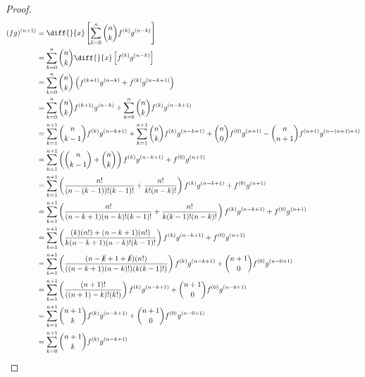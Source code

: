 \documentclass{article}
\begin{document}
\begin{itemize}
\begin{proof}
\begin{align*}
	(fg)^{(n+1)}&=\diff{}{x}\left[\sum_{k=0}^{n}\binom{n}{k}f^{(k)}g^{(n-k)}\right] \\
	&=\sum_{k=0}^{n}\binom{n}{k}\diff{}{x}\left[f^{(k)}g^{(n-k)}\right] \\
	&=\sum_{k=0}^{n}\binom{n}{k}\left(f^{(k+1)}g^{(n-k)}+f^{(k)}g^{(n-k+1)}\right) \\
	&=\sum_{k=0}^{n}\binom{n}{k}f^{(k+1)}g^{(n-k)}+\sum_{k=0}^{n}\binom{n}{k}f^{(k)}g^{(n-k+1)} \\
	&=\sum_{k=1}^{n+1}\binom{n}{k-1}f^{(k)}g^{(n-k+1)}+\sum_{k=1}^{n+1}\binom{n}{k}f^{(k)}g^{(n-k+1)}+\binom{n}{0}f^{(0)}g^{(n+1)}-\binom{n}{n+1}f^{(n+1)}g^{(n-(n+1)+1)} \\
	&=\sum_{k=1}^{n+1}\left(\binom{n}{k-1}+\binom{n}{k}\right)f^{(k)}g^{(n-k+1)}+f^{(0)}g^{(n+1)} \\
	&=\sum_{k=1}^{n+1}\left(\frac{n!}{(n-(k-1))!(k-1)!}+\frac{n!}{k!(n-k)!}\right)f^{(k)}g^{(n-k+1)}+f^{(0)}g^{(n+1)} \\
	&=\sum_{k=1}^{n+1}\left(\frac{n!}{(n-k+1)(n-k)!(k-1)!}+\frac{n!}{k(k-1)!(n-k)!}\right)f^{(k)}g^{(n-k+1)}+f^{(0)}g^{(n+1)} \\
	&=\sum_{k=1}^{n+1}\left(\frac{(k)(n!)+(n-k+1)(n!)}{k(n-k+1)(n-k)!(k-1)!}\right)f^{(k)}g^{(n-k+1)}+f^{(0)}g^{(n+1)} \\
	&=\sum_{k=1}^{n+1}\left(\frac{(n-\cancel{k}+1+\cancel{k})(n!)}{((n-k+1)(n-k)!)(k(k-1)!)}\right)f^{(k)}g^{(n-k+1)}+\binom{n+1}{0}f^{(0)}g^{(n-0+1)} \\
	&=\sum_{k=1}^{n+1}\left(\frac{(n+1)!}{((n+1)-k)!(k!)}\right)f^{(k)}g^{(n-k+1)}+\binom{n+1}{0}f^{(0)}g^{(n-0+1)} \\
	&=\sum_{k=1}^{n+1}\binom{n+1}{k}f^{(k)}g^{(n-k+1)}+\binom{n+1}{0}f^{(0)}g^{(n-0+1)} \\
	&=\sum_{k=0}^{n+1}\binom{n+1}{k}f^{(k)}g^{(n-k+1)}
\end{align*}
\end{proof}

\end{itemize}
\end{document}
